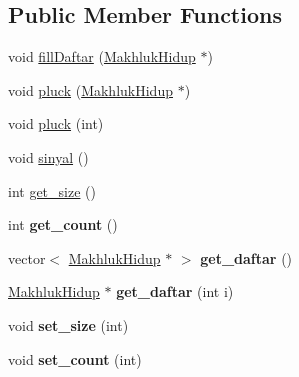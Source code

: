 \subsection*{Public Member Functions}
\begin{DoxyCompactItemize}
\item 
void \hyperlink{class_administrator_makhluk_hidup_a7ce0c30393bf700eeed47fbf9c58ac04}{fill\+Daftar} (\hyperlink{class_makhluk_hidup}{Makhluk\+Hidup} $\ast$)
\item 
void \hyperlink{class_administrator_makhluk_hidup_a0766cdee6be5104128c72a6ddbc6de19}{pluck} (\hyperlink{class_makhluk_hidup}{Makhluk\+Hidup} $\ast$)
\item 
void \hyperlink{class_administrator_makhluk_hidup_a5faae20a3dfedeab6432ab0a251a7533}{pluck} (int)
\item 
void \hyperlink{class_administrator_makhluk_hidup_a9c62c4de8062108c6e7f08fc685c1e12}{sinyal} ()
\item 
int \hyperlink{class_administrator_makhluk_hidup_aa3da88881045da27c9fcb469215bce70}{get\+\_\+size} ()
\item 
int {\bfseries get\+\_\+count} ()\hypertarget{class_administrator_makhluk_hidup_a69edc3e32e43b014497a543a1e8bc1b9}{}\label{class_administrator_makhluk_hidup_a69edc3e32e43b014497a543a1e8bc1b9}

\item 
vector$<$ \hyperlink{class_makhluk_hidup}{Makhluk\+Hidup} $\ast$ $>$ {\bfseries get\+\_\+daftar} ()\hypertarget{class_administrator_makhluk_hidup_ab1a5bd8794328bad534ad07d36a8c2bb}{}\label{class_administrator_makhluk_hidup_ab1a5bd8794328bad534ad07d36a8c2bb}

\item 
\hyperlink{class_makhluk_hidup}{Makhluk\+Hidup} $\ast$ {\bfseries get\+\_\+daftar} (int i)\hypertarget{class_administrator_makhluk_hidup_aa5b4c827a367d5f533c77cd410f5575a}{}\label{class_administrator_makhluk_hidup_aa5b4c827a367d5f533c77cd410f5575a}

\item 
void {\bfseries set\+\_\+size} (int)\hypertarget{class_administrator_makhluk_hidup_a5181a812a939b545d9e183a20d1bea2f}{}\label{class_administrator_makhluk_hidup_a5181a812a939b545d9e183a20d1bea2f}

\item 
void {\bfseries set\+\_\+count} (int)\hypertarget{class_administrator_makhluk_hidup_ae196f8f31ce2dbe2be9074547e3164a0}{}\label{class_administrator_makhluk_hidup_ae196f8f31ce2dbe2be9074547e3164a0}

\end{DoxyCompactItemize}


